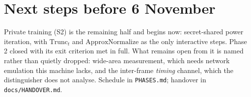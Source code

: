 \vspace{2.5em}

\section*{Next steps before 6 November}

Private training (S2) is the remaining half and begins now: secret-shared power
iteration, with $\mathrm{Trunc}_t$ and $\mathrm{ApproxNormalize}$ as the only
interactive steps. Phase 2 closed with its exit criterion met in full. What
remains open from it is named rather than quietly dropped: wide-area
measurement, which needs network emulation this machine lacks, and the
inter-frame \emph{timing} channel, which the distinguisher does not analyse.
Schedule in \texttt{PHASES.md}; handover in \texttt{docs/HANDOVER.md}.


